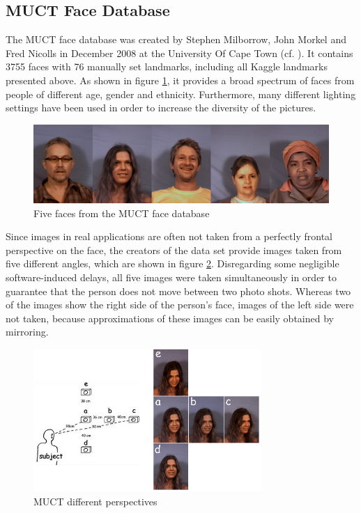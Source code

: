 \documentclass[11pt, a4paper]{article}
\begin{document}
\subsection{MUCT Face Database}

The \acf{MUCT} face database was created by Stephen Milborrow, John Morkel and Fred Nicolls in December 2008 at the University Of Cape Town (cf. \cite{muct}). It contains 3755 faces with 76 manually set landmarks, including all Kaggle landmarks presented above. As shown in figure \ref{fig:muctfaces}, it provides a broad spectrum of faces from people of different age, gender and ethnicity. Furthermore, many different lighting settings have been used in order to increase the diversity of the pictures.

\begin{figure}[htbp]
	\centering
	\includegraphics[width=\textwidth]{muct_faces.png}
	\caption{Five faces from the MUCT face database}
	\label{fig:muctfaces}
\end{figure}

Since images in real applications are often not taken from a perfectly frontal perspective on the face, the creators of the data set provide images taken from five different angles, which are shown in figure \ref{fig:muctangles}. Disregarding some negligible software-induced delays, all five images were taken simultaneously in order to guarantee that the person does not move between two photo shots. Whereas two of the images show the right side of the person's face, images of the left side were not taken, because approximations of these images can be easily obtained by mirroring.

\begin{figure}[htbp]
	\centering
	\includegraphics[width=0.77\textwidth]{muct_perspectives.png}
	\caption[MUCT different derspectives]{MUCT different perspectives\footnotemark}
	\label{fig:muctangles}
\end{figure}
\end{document}
